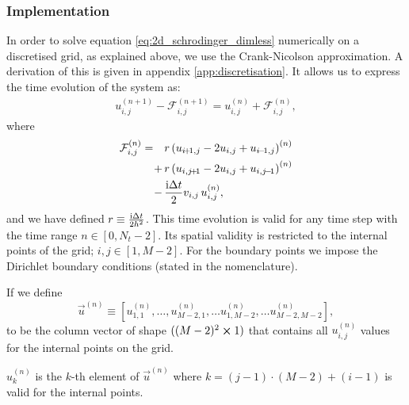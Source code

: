     \subsubsection{Implementation}
        In order to solve equation \eqref{eq:2d_schrodinger_dimless} numerically on a discretised grid, as explained above, we use the Crank-Nicolson approximation. A derivation of this is given in appendix \ref{app:discretisation}. It allows us to express the time evolution of the system as:
        \begin{align}\label{eq:equation_to_solve_non-matrix}
            u_{i,j}^{(n+1)} - \mathcal{F}_{i,j}^{(n+1)} = u_{i, j}^{(n)} + \mathcal{F}_{i,j}^{(n)},
        \end{align}
        where 
        \begin{equation}
            \begin{split}
            \mathcal{F}_{i,j}^{(n)} = \quad&r\closed{ u_{i\!+\!1, j}-2u_{i,j} + u_{i\!-\!1, j}}^{(n)}  \\
            +\,&  r\closed{u_{i,j\!+\!1}-2u_{i,j} + u_{i,j\!-\!1}}^{(n)}\\ 
            -\,& \frac{\im \Delta t}{2} v_{i,j}\,u_{i,j}^{(n)},
            \end{split}
        \end{equation}
        and we have defined $r\equiv \frac{\mathrm{i}\Delta t}{2h^2}$. This time evolution is valid for any time step with the time range $n\in[0,N_t-2]$. Its spatial validity is restricted to the internal points of the grid; $i,j\in[1,M-2]$. For the boundary points we impose the Dirichlet boundary conditions (stated in the nomenclature). 

        If we define 
        \begin{equation}
            \vec{u}^{(n)} \equiv [u_{1,1}^{(n)}, \dots, u_{M-2,1}^{(n)}, \dots u_{1,M-2}^{(n)}, \dots u_{M-2, M-2}^{(n)}],
        \end{equation}
        to be the column vector of shape $((M-2)^2 \cross 1)$ that contains all $u_{i,j}^{(n)}$ values for the internal points on the grid.
        
        $u_k^{(n)}$ is the $k$-th element of $\vec{u}^{(n)}$ where $k=(j-1)\cdot(M-2) + (i-1)$ is valid for the internal points.
        
